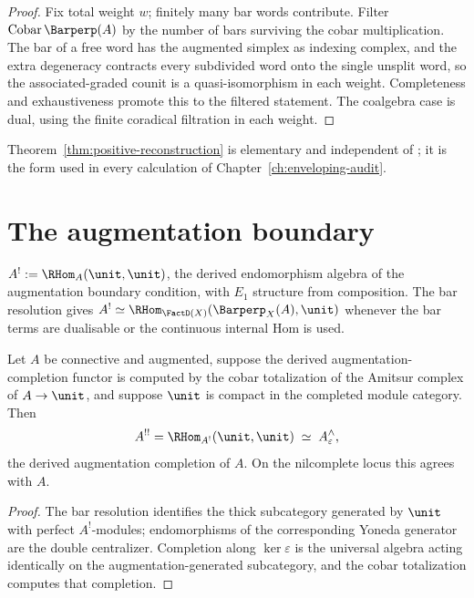 \begin{proof}
Fix total weight $w$; finitely many bar words contribute. Filter
$\mathrm{Cobar}\,\Barperp(A)$ by the number of bars surviving the cobar
multiplication. The bar of a free word has the augmented simplex as
indexing complex, and the extra degeneracy contracts every subdivided
word onto the single unsplit word, so the associated-graded counit is a
quasi-isomorphism in each weight. Completeness and exhaustiveness promote
this to the filtered statement. The coalgebra case is dual, using the
finite coradical filtration in each weight.
\end{proof}

Theorem~\ref{thm:positive-reconstruction} is elementary and independent of
\cite{Heu24}; it is the form used in every calculation of
Chapter~\ref{ch:enveloping-audit}.

\section{The augmentation boundary}

\begin{definition}
\label{def:koszul-dual}
$A^! := \RHom_A(\unit,\unit)$, the derived endomorphism algebra of the
augmentation boundary condition, with $E_1$ structure from composition.
The bar resolution gives $A^!\simeq\RHom_{\FactD(X)}(\Barperp_X(A),\unit)$
whenever the bar terms are dualisable or the continuous internal Hom is
used.
\end{definition}

\begin{theorem}
\label{thm:double-centralizer}
\StatusConditional{} Let $A$ be connective and augmented, suppose the
derived augmentation-completion functor is computed by the cobar
totalization of the Amitsur complex of $A\to\unit$, and suppose $\unit$ is
compact in the completed module category. Then
\[
  A^{!!} = \RHom_{A^!}(\unit,\unit) \;\simeq\; A^{\wedge}_\varepsilon ,
\]
the derived augmentation completion of $A$. On the nilcomplete locus this
agrees with $A$.
\end{theorem}

\begin{proof}
The bar resolution identifies the thick subcategory generated by $\unit$
with perfect $A^!$-modules; endomorphisms of the corresponding Yoneda
generator are the double centralizer. Completion along $\ker\varepsilon$
is the universal algebra acting identically on the
augmentation-generated subcategory, and the cobar totalization computes
that completion.
\end{proof}

